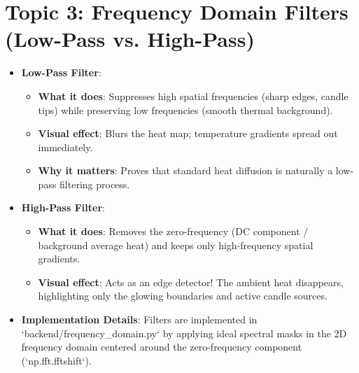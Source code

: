 \documentclass[11pt]{book}
\begin{document}
\section{Topic 3: Frequency Domain Filters (Low-Pass vs. High-Pass)}
\begin{itemize}
    \item \textbf{Low-Pass Filter}:
    \begin{itemize}
        \item \textbf{What it does}: Suppresses high spatial frequencies (sharp edges, candle tips) while preserving low frequencies (smooth thermal background).
        \item \textbf{Visual effect}: Blurs the heat map; temperature gradients spread out immediately.
        \item \textbf{Why it matters}: Proves that standard heat diffusion is naturally a low-pass filtering process.
    \end{itemize}
    \item \textbf{High-Pass Filter}:
    \begin{itemize}
        \item \textbf{What it does}: Removes the zero-frequency (DC component / background average heat) and keeps only high-frequency spatial gradients.
        \item \textbf{Visual effect}: Acts as an edge detector! The ambient heat disappears, highlighting only the glowing boundaries and active candle sources.
    \end{itemize}
    \item \textbf{Implementation Details}: Filters are implemented in `backend/frequency\_domain.py` by applying ideal spectral masks in the 2D frequency domain centered around the zero-frequency component (`np.fft.fftshift`).
\end{itemize}
\end{document}
